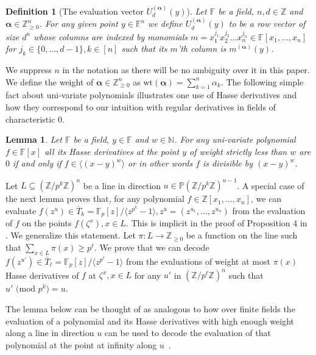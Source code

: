 \documentclass[11pt]{article}
\numberwithin{equation}{section}
\newtheorem{lem}[thm]{Lemma}
\newtheorem{define}[thm]{Definition}
\def\F{{\mathbb{F}}}
\def\Z{{\mathbb{Z}}}
\def\N{{\mathbb{N}}}
\def\P{{\mathbb{P}}}
\def\balpha{{\bm \alpha}}
\begin{document}
\begin{define}[The evaluation vector $U_{d}^{(\balpha)}(y)$]
Let $\F$ be a field, $n,d\in \Z$ and $\balpha\in \Z_{\ge 0}^n$. For any given point $y\in \F^n$ we define $U_d^{(\balpha)}(y)$ to be a row vector of size $d^n$ whose columns are indexed by monomials $m=x_1^{j_1}x_2^{j_2}\hdots x_n^{j_n}\in \F[x_1,\hdots,x_n]$ for $j_k\in \{0,\hdots,d-1\},k\in [n]$ such that its $m$'th column is $m^{(\balpha)}(y)$. 
\end{define}

We suppress $n$ in the notation as there will be no ambiguity over it in this paper. We define the weight of $\balpha\in \Z_{\ge 0}^n$ as  $\text{wt}(\balpha)=\sum_{k=1}^n \alpha_k$. The following simple fact about uni-variate polynomials illustrates one use of Hasse derivatives and how they correspond to our intuition with regular derivatives in fields of characteristic $0$.

\begin{lem}\label{fact:Hasse}
Let $\F$ be a field, $y\in \F$ and $w\in \N$. For any uni-variate polynomial $f\in\F[x]$ all its Hasse derivatives at the point $y$ of weight strictly less than $w$ are $0$ if and only if $f\in \langle (x-y)^w\rangle$ or in other words $f$ is divisible by $(x-y)^w$.
\end{lem}

Let $L\subseteq (\Z/p^k\Z)^n$ be a line in direction $u\in \P (\Z/p^k\Z)^{n-1}$. A special case of the next lemma proves that, for any polynomial $f\in \Z[x_1,\hdots,x_n]$, we can evaluate $f(z^{u})\in \overline{T}_k=\F_p[z]/\langle z^{p^k}-1\rangle,z^{u}=(z^{u_1},\hdots,z^{u_n})$ from the evaluation of $f$ on the points $f(\zeta^x),x\in L$. This is implicit in the proof of Proposition 4 in \cite{arsovski2021padic}. We generalize this statement. Let $\pi: L \rightarrow \Z_{\ge 0}$ be a function on the line such that $\sum_{x\in L}\pi(x)\ge p^\ell$. We prove that we can decode $f(z^{u'})\in \overline{T}_{\ell}=\F_p[z]/\langle z^{p^\ell}-1\rangle$ from the evaluations of weight at most $\pi(x)$ Hasse derivatives of $f$ at $\zeta^x,x\in L$ for any $u'$ in $(\Z/p^\ell\Z)^n$ such that $u'\text{ (mod }p^k\text{)}=u$.

The lemma below can be thought of as analogous to how over finite fields the evaluation of a polynomial and its Hasse derivatives with high enough weight along a line in direction $u$ can be used to decode the evaluation of that polynomial at the point at infinity along $u$~\cite{dvir2013extensions}.
\end{document}
